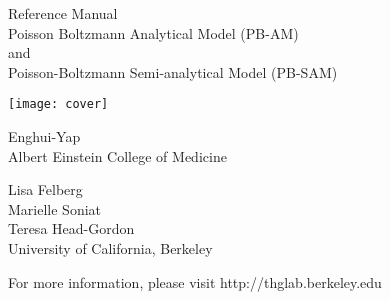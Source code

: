 

\begin{titlepage}
\begin{center}
\vspace{5pt}

	Reference Manual\\ 
	Poisson Boltzmann Analytical Model (PB-AM)\\ 
	and\\ 
	Poisson-Boltzmann Semi-analytical Model (PB-SAM) 
\vspace{5pt}

\texttt{[image: cover]}

	Enghui-Yap\\  
	Albert Einstein College of Medicine\\ 
\vspace{5pt}	
	
	Lisa Felberg\\ 
	Marielle Soniat\\ 
	Teresa Head-Gordon\\ 
	University of California, Berkeley  
\vspace{5pt}

For more information, please visit http://thglab.berkeley.edu \\
\vspace{5pt}
\end{center}
\end{titlepage}


